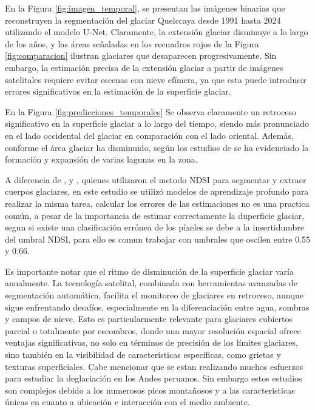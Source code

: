 En la Figura \ref{fig:imagen_temporal}, se presentan las imágenes binarias que reconstruyen la segmentación del glaciar Quelccaya desde 1991 hasta 2024 utilizando el modelo U-Net. Claramente, la extensión glaciar disminuye a lo largo de los años, y las áreas señaladas en los recuadros rojos de la Figura \ref{fig:comparacion} ilustran glaciares que desaparecen progresivamente. Sin embargo, la estimación precisa de la extensión glaciar a partir de imágenes satelitales requiere evitar escenas con nieve efímera, ya que esta puede introducir errores significativos en la estimación de la superficie glaciar. 

En la Figura \ref{fig:predicciones_temporales} Se observa claramente un retroceso significativo en la superficie glaciar a lo largo del tiempo, siendo más pronunciado en el lado occidental del glaciar en comparación con el lado oriental. Además, conforme el área glaciar ha disminuido, según los estudios de \parencite{inaigem2023} se ha evidenciado la formación y expansión de varias lagunas en la zona.

A diferencia de \parencite{malone2022evolution}, \parencite{taylor2022multi} y \parencite{hanshaw2014glacial}, quienes utilizaron el metodo NDSI para segmentar y extraer cuerpos glaciares, en este estudio se utilizó modelos de aprendizaje profundo para realizar la misma tarea, calcular los errores de las estimaciones no es una practica común, a pesar de la importancia de estimar correctamente la duperficie glaciar, segun \parencite{montoya2024estimation} si existe una clasificación errónea de los píxeles se debe a la insertidumbre del umbral NDSI, para ello es comun trabajar con umbrales que oscilen entre 0.55 y 0.66.

Es importante notar que el ritmo de disminución de la superficie glaciar varía anualmente. La tecnología satelital, combinada con herramientas avanzadas de segmentación automática, facilita el monitoreo de glaciares en retroceso, aunque sigue enfrentando desafíos, especialmente en la diferenciación entre agua, sombras y campos de nieve. Esto es particularmente relevante para glaciares cubiertos parcial o totalmente por escombros, donde una mayor resolución espacial ofrece ventajas significativas, no solo en términos de precisión de los límites glaciares, sino también en la visibilidad de características específicas, como grietas y texturas superficiales. Cabe mencionar que se estan realizando muchos esfuerzos para estudiar la deglaciación en los Andes peruanos. Sin embargo estos estudios son complejos debido a los numerosos picos montañosos y a las caracteristicas únicas en cuanto a ubicación e interacción con el medio ambiente. 

